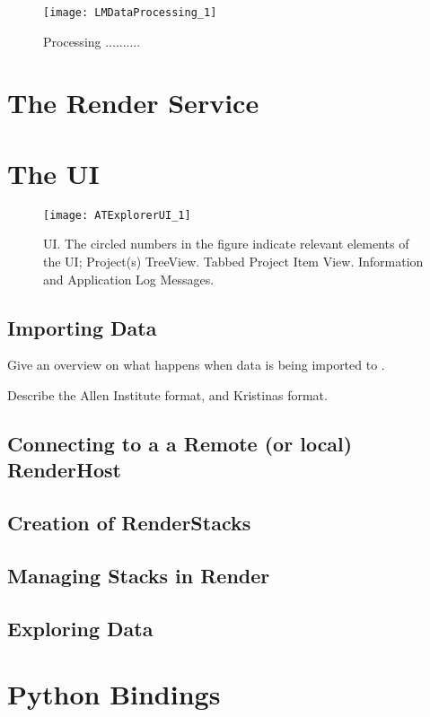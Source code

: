 \begin{figure}[h]
\centering\texttt{[image: LMDataProcessing\_1]}

\caption{Processing ..........}
\end{figure}

\section{The Render Service}

\clearpage

\section{The \ate UI}

\begin{figure}[h]
\centering\texttt{[image: ATExplorerUI\_1]}

\caption{\ate{} UI. The circled numbers in the figure indicate relevant elements of the UI; \protect{} Project(s) TreeView. \protect{} Tabbed Project Item View. \protect{} Information and Application Log Messages.}
\end{figure}

\subsection{Importing Data}

\begin{description}[font=$\bullet$~\normalfont\scshape\color{red!50!black}]
\item [Importing process] Give an overview on what happens when data is being imported to \ate.
\item [Data Formats] Describe the Allen Institute format, and Kristinas format.
\end{description}

\subsection{Connecting to a a Remote (or local) RenderHost}

\subsection{Creation of RenderStacks}

\subsection{Managing Stacks in Render}

\subsection{Exploring Data}

\section{Python Bindings}